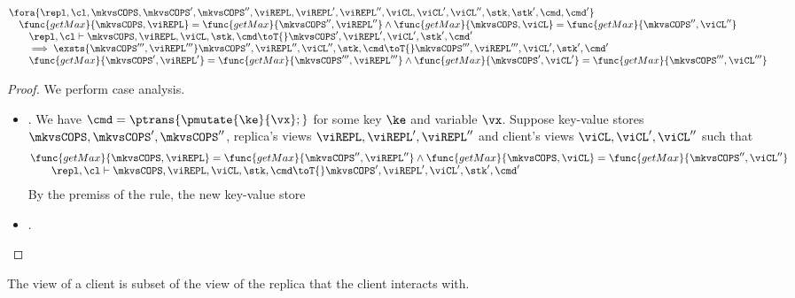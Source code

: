 \begin{lemma}
\[
    \begin{array}{@{}l@{}}
    \fora{\repl, \cl, \mkvsCOPS, \mkvsCOPS', \mkvsCOPS'', \viREPL, \viREPL', \viREPL'', \viCL, \viCL', \viCL'', \stk, \stk', \cmd, \cmd'} \\
    \quad \func{getMax}{\mkvsCOPS, \viREPL} = \func{getMax}{\mkvsCOPS'', \viREPL''} 
    \land \func{getMax}{\mkvsCOPS, \viCL} = \func{getMax}{\mkvsCOPS'', \viCL''} \\
    \qquad \repl, \cl \vdash 
    \mkvsCOPS, \viREPL, \viCL, \stk, \cmd \toT{}
    \mkvsCOPS', \viREPL', \viCL', \stk', \cmd' \\
    \qquad \implies 
    \exsts{\mkvsCOPS''', \viREPL'''}
    \mkvsCOPS'', \viREPL'', \viCL'', \stk, \cmd \toT{}
    \mkvsCOPS''', \viREPL''', \viCL', \stk', \cmd' \\
    \qquad \func{getMax}{\mkvsCOPS', \viREPL'} = \func{getMax}{\mkvsCOPS''', \viREPL'''} 
    \land \func{getMax}{\mkvsCOPS', \viCL'} = \func{getMax}{\mkvsCOPS''', \viCL'''} \\
    \end{array}
\]
\end{lemma}
\begin{proof}
We perform case analysis.
\begin{itemize}
    \item {}.
        We have \( \cmd =  \ptrans{\pmutate{\ke}{\vx};} \) for some key \( \ke \) and variable \( \vx \).
        Suppose key-value stores \(  \mkvsCOPS, \mkvsCOPS', \mkvsCOPS'' \), 
        replica's views \( \viREPL, \viREPL', \viREPL''\) and client's views \( \viCL, \viCL', \viCL''\) such that
        \[
        \begin{array}{@{}l@{}}
        \func{getMax}{\mkvsCOPS, \viREPL} = \func{getMax}{\mkvsCOPS'', \viREPL''} 
        \land \func{getMax}{\mkvsCOPS, \viCL} = \func{getMax}{\mkvsCOPS'', \viCL''} \\
        \qquad \repl, \cl \vdash 
        \mkvsCOPS, \viREPL, \viCL, \stk, \cmd \toT{}
        \mkvsCOPS', \viREPL', \viCL', \stk', \cmd' \\
        \end{array}
        \]
        By the premiss of the  rule, the new key-value store
        \[
        \]
    \item {}.
\end{itemize}
\end{proof}

\begin{lemma}
    \label{lem:client-subset-repl}
    The view of a client is subset of the view of the replica that the client interacts with.
\end{lemma}

